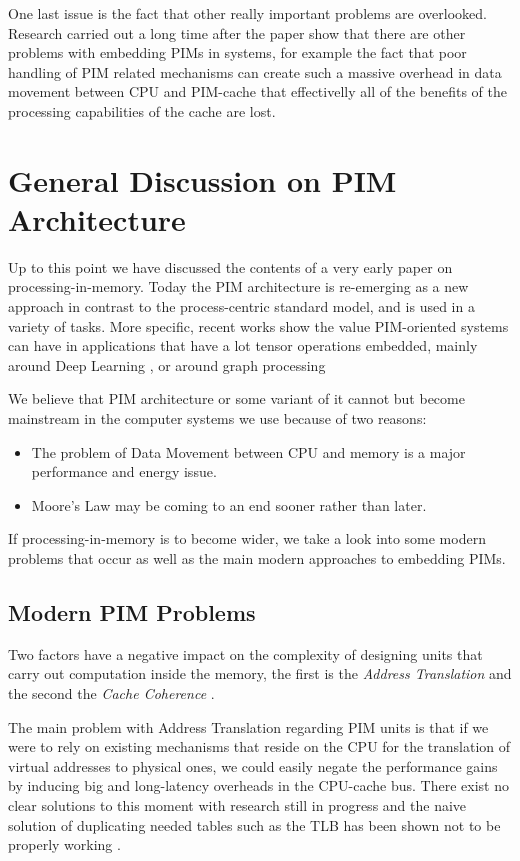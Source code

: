 \documentclass[12pt,twocolumn]{IEEEtran}
\begin{document}
One last issue is the fact that other really important problems are overlooked. Research carried out a long time after the paper show that there are other problems with embedding PIMs in systems, for example the fact that poor handling of PIM related mechanisms can create such a massive overhead in data movement between CPU and PIM-cache that effectivelly all of the benefits of the processing capabilities of the cache are lost. \cite{PAPER:3}

\section{General Discussion on PIM Architecture}

Up to this point we have discussed the contents of a very early paper on processing-in-memory. Today the PIM architecture is re-emerging as a new approach in contrast to the process-centric standard model, and is used in a variety of tasks. More specific, recent works show the value PIM-oriented systems can have in applications that have a lot tensor operations embedded, mainly around Deep Learning \cite{}, or around graph processing \cite{GraphPIM}

We believe that PIM architecture or some variant of it cannot but become mainstream in the computer systems we use because of two reasons:
\begin{itemize}
\item{The problem of Data Movement between CPU and memory is a major performance and energy issue.}
\item{Moore's Law may be coming to an end sooner rather than later.}
\end{itemize}
If processing-in-memory is to become wider, we take a look into some modern problems that occur as well as the main modern approaches to embedding PIMs.

\subsection{Modern PIM Problems}

Two factors have a negative impact on the complexity of designing units that carry out computation inside the memory, the first is the \textit{Address Translation} and the second the \textit{Cache Coherence} \cite{PAPER:3}.

The main problem with Address Translation regarding PIM units is that if we were to rely on existing mechanisms that reside on the CPU for the translation of virtual addresses to physical ones, we could easily negate the performance gains by inducing big and long-latency overheads in the CPU-cache bus. There exist no clear solutions to this moment with research still in progress \cite{PAPER:3} and the naive solution of duplicating needed tables such as the TLB has been shown not to be properly working \cite{PAPER:3}.
\end{document}
